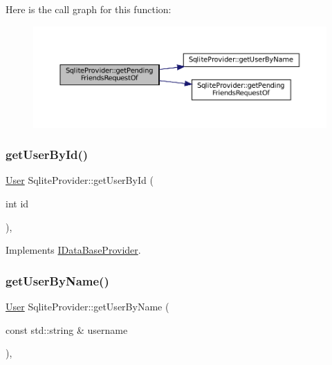 Here is the call graph for this function\+:
\nopagebreak
\begin{figure}[H]
\begin{center}
\leavevmode
\includegraphics[width=350pt]{classSqliteProvider_a82dcdc27e96ff8bfe63989af3e6eff62_cgraph}
\end{center}
\end{figure}
\mbox{\label{classSqliteProvider_a1e6db27d238aadcb5871c278521aea72}} 
\subsubsection{\texorpdfstring{get\+User\+By\+Id()}{getUserById()}}
{\footnotesize\ttfamily \mbox{\hyperlink{structUser}{User}} Sqlite\+Provider\+::get\+User\+By\+Id (\begin{DoxyParamCaption}\item[{int}]{id }\end{DoxyParamCaption})\hspace{0.3cm}{\ttfamily [override]}, {\ttfamily [virtual]}}



Implements \mbox{\hyperlink{classIDataBaseProvider_a91cd76a2802e4dc03184f305a6624124}{I\+Data\+Base\+Provider}}.

\mbox{\label{classSqliteProvider_a2654aee827789cfc1d40e9992d441056}} 
\subsubsection{\texorpdfstring{get\+User\+By\+Name()}{getUserByName()}}
{\footnotesize\ttfamily \mbox{\hyperlink{structUser}{User}} Sqlite\+Provider\+::get\+User\+By\+Name (\begin{DoxyParamCaption}\item[{const std\+::string \&}]{username }\end{DoxyParamCaption})\hspace{0.3cm}{\ttfamily [override]}, {\ttfamily [virtual]}}



